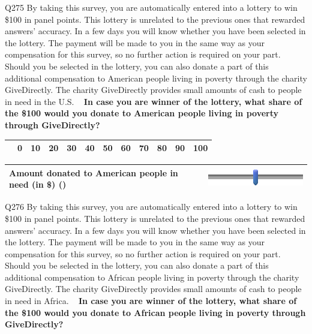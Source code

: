 \documentclass{article} %
\begin{document}
\noindent 

\noindent 

\noindent Q275 By taking this survey, you are automatically entered into a lottery to win \$100 in panel points. This lottery is unrelated to the previous ones that rewarded answers' accuracy. In a few days you will know whether you have been selected in the lottery. The payment will be made to you in the same way as your compensation for this survey, so no further action is required on your part.  ~  Should you be selected in the lottery, you can also donate a part of this additional compensation to American people living in poverty through the charity GiveDirectly. The charity GiveDirectly provides small amounts of cash to people in need in the U.S.  ~ \textbf{In case you are winner of the lottery, what share of the \$100 would you donate to American people living in poverty through GiveDirectly?}

\begin{tabular}{|p{2.2in}|p{0.2in}|p{0.2in}|p{0.2in}|p{0.2in}|p{0.2in}|p{0.2in}|p{0.2in}|p{0.2in}|p{0.2in}|p{0.2in}|p{0.2in}|} \hline 
 & 0 & 10 & 20 & 30 & 40 & 50 & 60 & 70 & 80 & 90 & 100 \\ \hline 
\end{tabular}



\begin{tabular}{|p{2.2in}|p{2.2in}|} \hline 
Amount donated to American people in need (in \$) () & \includegraphics*[width=2.08in, height=0.33in]{image9} \\ \hline 
\end{tabular}



\noindent 

\noindent 

\noindent 

\noindent Q276 By taking this survey, you are automatically entered into a lottery to win \$100 in panel points. This lottery is unrelated to the previous ones that rewarded answers' accuracy. In a few days you will know whether you have been selected in the lottery. The payment will be made to you in the same way as your compensation for this survey, so no further action is required on your part.  ~  Should you be selected in the lottery, you can also donate a part of this additional compensation to African people living in poverty through the charity GiveDirectly. The charity GiveDirectly provides small amounts of cash to people in need in Africa.  ~  \textbf{In case you are winner of the lottery, what share of the \$100 would you donate to African people living in poverty through GiveDirectly?}
\end{document}
